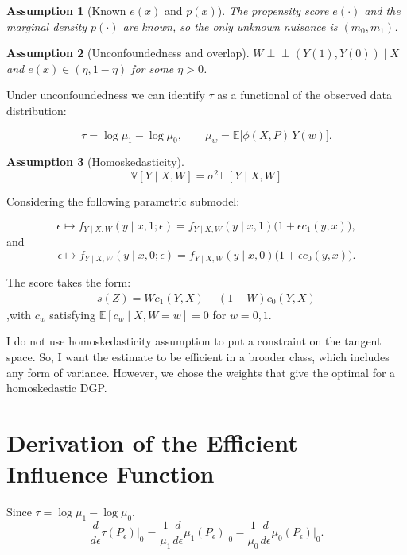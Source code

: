 \documentclass{article}
\newtheorem{assumption}{Assumption}
\begin{document}
\begin{assumption}[Known $e(x)$ and $p(x)$]
The propensity score $e(\cdot)$ and the marginal density $p(\cdot)$ are known, so the only unknown nuisance is $(m_0,m_1)$.
\end{assumption}

\begin{assumption}[Unconfoundedness and overlap]
$W \perp\!\!\!\perp (Y(1),Y(0))\mid X$ and $e(x)\in(\eta,1-\eta)$ for some $\eta>0$.
\end{assumption}

Under unconfoundedness we can identify $\tau$ as a functional of the observed data distribution:

\[
  \tau = \log\mu_1 - \log\mu_0,
  \qquad
  \mu_w = \mathbb{E}\bigl[\phi(X, P)\,Y(w)\bigr].
\]

\begin{assumption}[Homoskedasticity]
\[\mathbb{V}[Y\mid X,W] = \sigma^2\,\mathbb{E}[Y\mid X,W] \]
\end{assumption}

Considering the following parametric submodel:

\[
  \epsilon \mapsto f_{Y\mid X,W}(y \mid x, 1; \epsilon) = f_{Y\mid X,W}(y \mid x, 1)\bigl(1 + \epsilon c_1(y,x)\bigr),
\]
and
\[
  \epsilon \mapsto f_{Y\mid X,W}(y \mid x, 0; \epsilon) = f_{Y\mid X,W}(y \mid x, 0)\bigl(1 + \epsilon c_0(y,x)\bigr).
\]

The score takes the form:
\begin{align}
  s(Z) = W c_1(Y,X) + (1-W) c_0(Y,X)
\end{align}
,with $c_w$ satisfying $\mathbb{E}[c_w\mid X,W=w]=0$ for $w=0,1$.

I do not use homoskedasticity assumption to put a constraint on the tangent space. So, I want the estimate to be efficient in a broader class, which includes any form of variance. However, we chose the weights that give the optimal for a homoskedastic DGP.


\section*{Derivation of the Efficient Influence Function}

Since $\tau = \log\mu_1 - \log\mu_0$,
\begin{equation}
  \label{eq:delta}
  \frac{d}{d\epsilon}\tau(P_\epsilon)\bigg|_0
  = \frac{1}{\mu_1}\frac{d}{d\epsilon}\mu_1(P_\epsilon)\bigg|_0
  - \frac{1}{\mu_0}\frac{d}{d\epsilon}\mu_0(P_\epsilon)\bigg|_0 .
\end{equation}
\end{document}
